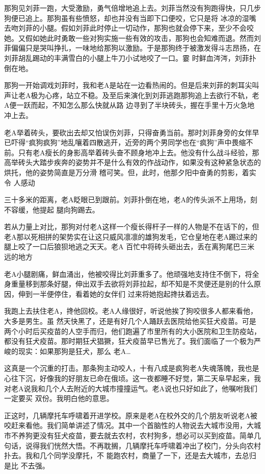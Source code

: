 \documentclass{article}
\begin{document}
那狗见刘菲一跑，大受激励，勇气倍增地追上去。刘菲当然没有狗跑得快，只几步狗便已追上。那狗虽有些愤怒，却也并没有当即下口便咬，它只是将
\newpage
冰凉的湿嘴去吻刘菲的小腿。假如刘菲此时停止一切动作，那狗也就会停下来，至少不会咬她。又假如她此时勇敢一些对狗实施一些有效的攻击，那狗也会知难而退。然而刘菲偏偏只是哭叫挣扎，一味地给那狗以激励。于是那狗终于被激发得斗志昂扬，在刘菲胡乱踢动的丰满雪白的小腿上牛刀小试地咬了一口。霎
时鲜血涔涔，刘菲扑倒在地。 

那狗一开始调戏刘菲时，我和老A是站在一边看热闹的。但是后来刘菲的刺耳尖叫声让老A极为心疼，站立不稳。及至后来演化到刘菲逃跑那狗追上去欲行不轨，老A便一跃而起，不知怎么那么快就从路
边寻到了半块砖头，握在手里十万火急地冲上去。 

老A举着砖头，要砍出去却又怕误伤刘菲，只得奋勇当前。那时刘菲身旁的女伴早已吓得“疯狗疯狗”地乱嚷着四散逃开，近旁的两个男同学也在“疯狗”声中畏缩不前。只有老A瘦长的身影高举着砖头奋不顾身地冲上去。他没有什么战斗经验，那高举砖头大踏步疾奔的姿势并不是什么有效的作战动作，如果没有这种紧急状态的烘托，他的姿势简直是万分滑
\newpage
稽可笑。但，此时，他那夕阳中奋勇的剪影，着实令
人感动 

三十多米的距离，老A眨眼已到跟前。刘菲扑倒在地，老A的传头派不上用场，刻不容缓，他提起
腿向狗踢去。 

若从力量上对比，那狗对付老A这样一个瘦长得杆子一样的人物是不在话下的，但老A那以死相拼的架势实在让这只威风凛凛的雄狗发毛，它仓皇地在老A踢过来的腿上咬了一口后狼狈地逃之天天。老A
百忙中将砖头砸出去，丢在离狗尾巴三米远的地方 

老A小腿剧痛，鲜血涌出，他被咬得比刘菲重多了。他顽强地支持住不倒下，将全身重量移到那条好腿，伸出双手去欲将刘菲拉起，却不知是不灵便还是别的什么原因，伸到一半便停住，看着她的女伴们
过来将她抱起搀扶着远去。 

我跑上去扶住老A，搀他回校。老A人缘很好，听说他挨了狗咬很多人都来看他，大多是男生。虽
\newpage
然天快黑了，还是有好几个人踊跃去医院给他买狂犬疫苗。可是两个小时后买疫苗的人空手而归，他们跑遍了市里所有的大小医院和卫生防疫站，都没有狂犬疫苗。那时期狂犬猖獗，狂犬疫苗早已售光了。我们面临了一个极为严峻的现实：如果那狗是狂犬，那么
老A… 

这真是一个沉重的打击。那条狗主动咬人，十有八成是疯狗老A失魂落魄，我也是心往下沉，好像我的好朋友已命在俄顷。这一夜都睡不好觉，第二天阜早起来，我对老A说我和几个人去附近的大城市撞撞运气。老A说也只好如此了，他嘱咐我们一定要买
双份。我明白他的意思。 

正这时，几辆摩托车呼啸着开进学校。原来是老A在校外交的几个朋友听说老A被咬赶来看他。我们简单讲述了情况。其中一个首脑性的人物说去大城市没用，大城市不养狗更没有狂犬疫苗，要去就去农村，农村狗多，想必可以买到疫苗。简单几句话，说得我们恍然大悟。不再耽搁，几辆摩托车呼啸着冲出了校门，分头向农村扑去。我和几个同学没摩托，不
\newpage
能跑农村，商量了一下，还是去大城市，去总归是比
不去强。 
\end{document}
